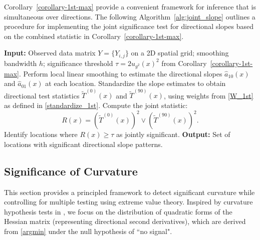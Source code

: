 \documentclass{article}
\begin{document}
Corollary~\ref{corollary-1st-max} provide a convenient framework for inference that is simultaneous over directions. The following Algorithm~\ref{alg:joint_slope} outlines a procedure for implementing the joint significance test for directional slopes based on the combined statistic in Corollary~\ref{corollary-1st-max}.

\begin{algorithm}[H]
	\caption{Directional Slope Joint Significance Procedure}
	\label{alg:joint_slope}
	\begin{algorithmic}[1]
		\State \textbf{Input:} Observed data matrix $Y = \{Y_{i,j}\}$ on a 2D spatial grid; smoothing bandwidth $h$; significance threshold $\tau = 2u_{g^2}(x)^2$ from Corollary~\ref{corollary-1st-max}.
		\State Perform local linear smoothing to estimate the directional slopes $\hat{a}_{10}(x)$ and $\hat{a}_{01}(x)$ at each location.
		\State Standardize the slope estimates to obtain directional test statistics $\tilde{T}^{(0)}(x)$ and $\tilde{T}^{(90)}(x)$, using weights from \eqref{W_1st} as defined in \eqref{standardize_1st}.
		\State Compute the joint statistic:
		\[
		R(x) = (\tilde{T}^{(0)}(x))^2 \vee (\tilde{T}^{(90)}(x))^2.
		\]
		\State Identify locations where $R(x) \geq \tau$ as jointly significant.
		\State \textbf{Output:} Set of locations with significant directional slope patterns.
	\end{algorithmic}
\end{algorithm}

\subsection{Significance of Curvature}
\label{sec-extreSSS}

This section provides a principled framework to detect significant curvature while controlling for multiple testing using extreme value theory. Inspired by curvature  hypothesis tests in \citep{godtliebsen2004statistical}, we focus on the distribution of quadratic forms of the Hessian matrix (representing directional second derivatives), which are derived from \eqref{argmin}
under the null hypothesis of ``no signal". 
\end{document}
